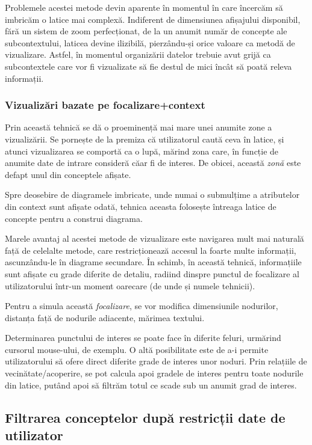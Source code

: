 \documentclass[12pt, a4paper, twoside, romanian]{teza-upb}
\begin{document}
        Problemele acestei metode devin aparente în momentul în care încercăm să imbricăm o latice mai complexă. Indiferent de dimensiunea afișajului disponibil, fără un sistem de zoom perfecționat,  de la un anumit număr de concepte ale subcontextului, laticea devine ilizibilă, pierzându-și orice valoare ca metodă de vizualizare. Astfel, în momentul organizării datelor trebuie avut grijă ca subcontextele care vor fi vizualizate să fie destul de mici încât să poată releva informații.

      \subsubsection{Vizualizări bazate pe focalizare+context}
      \label{subsubsec:focalizare}
      
      Prin această tehnică se dă o proeminență mai mare unei anumite zone a vizualizării. Se pornește de la premiza că utilizatorul caută ceva în latice, și atunci vizualizarea se comportă ca o lupă, mărind zona care, în funcție de anumite date de intrare consideră căar fi de interes. De obicei, această \textit{zonă} este defapt unul din conceptele afișate.

      Spre deosebire de diagramele imbricate, unde numai o submulțime a atributelor din context sunt afișate odată, tehnica aceasta folosește întreaga latice de concepte pentru a construi diagrama.

      Marele avantaj al acestei metode de vizualizare este navigarea mult mai naturală față de celelalte metode, care restricționează accesul la foarte multe informații, ascunzându-le în diagrame secundare. În schimb, în această tehnică, informațiile sunt afișate cu grade diferite de detaliu, radiind dinspre punctul de focalizare al utilizatorului într-un moment oarecare (de unde și numele tehnicii).

      Pentru a simula această \textit{focalizare}, se vor modifica dimensiunile nodurilor, distanța față de nodurile adiacente, mărimea textului.

      Determinarea punctului de interes se poate face în diferite feluri, urmărind cursorul mouse-ului, de exemplu. O altă posibilitate este de a-i permite utilizatorului să ofere direct diferite grade de interes unor noduri. Prin relațiile de vecinătate/acoperire, se pot calcula apoi gradele de interes pentru toate nodurile din latice, putând apoi să filtrăm totul ce scade sub un anumit grad de interes.
      \subsection{Filtrarea conceptelor după restricții date de utilizator}
\end{document}
